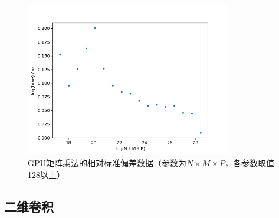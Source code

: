     \begin{figure}[!htbp]
        \centering
        \includegraphics[width=0.8\textwidth]{figures/matmul_gpu_nmp_rsd_big.png}
        \caption{GPU矩阵乘法的相对标准偏差数据（参数为$ N \times M \times P $，各参数取值128以上）}
        \label{fig:matmul_gpu_nmp_rsd_big}
    \end{figure}

\subsection{二维卷积}
